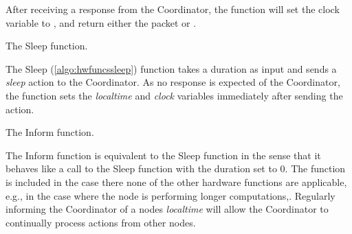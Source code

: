 After receiving a response from the Coordinator, the function will set the clock variable to \KwNow, and
return either the packet or \KwNull. \medbreak

\begin{algorithm}[ht]
    \DontPrintSemicolon
    
    
    \caption{The Sleep function.}
    \label{algo:hwfuncssleep}
\end{algorithm}

The Sleep (\autoref{algo:hwfuncssleep}) function takes a duration as input and sends a \textit{sleep} action to the
Coordinator. As no response is expected of the Coordinator, the function sets the \textit{localtime} and
\textit{clock} variables immediately after sending the action. \medbreak

\begin{algorithm}[ht]
    \DontPrintSemicolon
    
    
    \caption{The Inform function.}
    \label{algo:hwfuncsupdatelocaltime}
\end{algorithm}

The Inform function is equivalent to the Sleep function in the sense that it behaves like a call to the Sleep
function with the duration set to 0. The function is included in the case there none of the other hardware
functions are applicable, e.g., in the case where the node is performing longer computations,. Regularly
informing the Coordinator of a nodes \textit{localtime} will allow the Coordinator to continually process actions from
other nodes.
